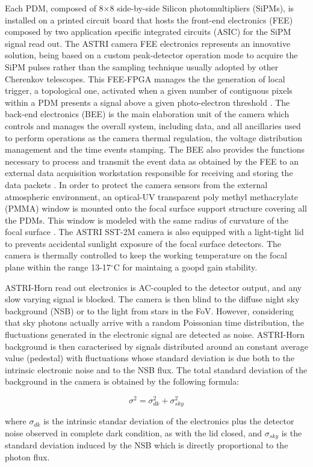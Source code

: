 Each PDM, composed of 8$\times$8 side-by-side Silicon photomultipliers (SiPMs), 
is installed on a printed circuit board that hosts the front-end electronics (FEE) composed by
 two application specific integrated circuits (ASIC) for the SiPM signal read out.
 The ASTRI camera FEE electronics \cite{Sottile2016} represents an innovative solution, being based on a custom peak-detector operation mode to acquire the SiPM pulses rather than the sampling technique usually adopted by other Cherenkov telescopes.
This FEE-FPGA manages the the generation of local trigger, a topological one, activated when a given number of contiguous pixels within a PDM presents a signal above a given photo-electron threshold \cite{Sottile2016}.
The back-end electronics (BEE) is the main elaboration unit of the camera which
controls and manages the overall system, including data, and
all ancillaries used to perform operations as
the camera thermal regulation, the voltage distribution management and the time events stamping.
The BEE also provides the functions necessary to process and transmit the event data as 
obtained by the FEE to an external data acquisition 
workstation responsible for receiving and storing the data packets \cite{Sottile2016}.
In order to protect the camera sensors from the external
atmospheric environment, an optical-UV transparent poly methyl methacrylate (PMMA)  window 
is mounted onto the focal surface support structure covering all the PDMs.
This window is modeled with the same radius of curvature of the focal surface \cite{Catalano2018}.
The ASTRI SST-2M camera is also equipped  with a light-tight lid to prevents accidental sunlight 
exposure of the focal surface detectors.
The camera is thermally controlled to keep the working temperature on the focal plane within the range 13-17$^\circ$C
for maintaing a goopd gain stability.


ASTRI-Horn read out electronics is AC-coupled to the detector output, and any slow varying signal is  blocked.
The camera is then blind to the diffuse night sky background (NSB) or to the light from stars in the FoV.   However, considering that sky photons actually arrive with a random Poissonian time distribution, the fluctuations generated in the electronic signal are detected as noise. ASTRI-Horn  background is then caracterised by signals distributed around an constant average value (pedestal) with fluctuations whose standard deviation is due both to the intrinsic electronic noise and to the NSB flux.  The total standard deviation of the background in the camera is obtained by the following formula:

\begin{equation}
\sigma^2=\sigma^2_{dk}+\sigma^2_{sky}
\end{equation}

\noindent
where $\sigma_{dk}$ is the intrinsic standar deviation of the electronics plus the detector noise observed in complete dark condition, as with the lid closed, and $\sigma_{sky}$ is the standard deviation induced by the  NSB  which is directly proportional to the photon flux.

